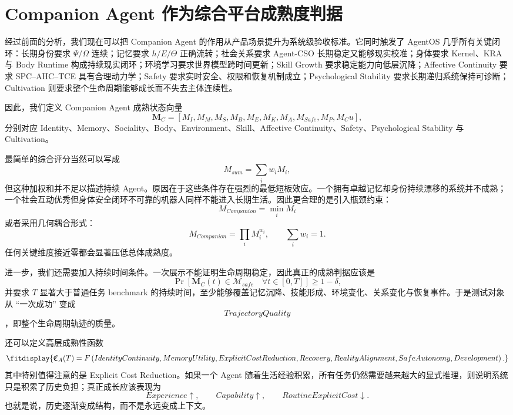\section{Companion Agent 作为综合平台成熟度判据}

经过前面的分析，我们现在可以把 Companion Agent 的作用从产品场景提升为系统级验收标准。它同时触发了 AgentOS 几乎所有关键闭环：长期身份要求 $\Psi/\Omega$ 连续；记忆要求 $h/E/\Theta$ 正确流转；社会关系要求 Agent-CSO 长期稳定又能够现实校准；身体要求 Kernel、KRA 与 Body Runtime 构成持续现实闭环；环境学习要求世界模型跨时间更新；Skill Growth 要求稳定能力向低层沉降；Affective Continuity 要求 SPC--AHC--TCE 具有合理动力学；Safety 要求实时安全、权限和恢复机制成立；Psychological Stability 要求长期递归系统保持可诊断；Cultivation 则要求整个生命周期能够成长而不失去主体连续性。

因此，我们定义 Companion Agent 成熟状态向量
\[
\mathbf M_C
=
[
M_I,
M_M,
M_S,
M_B,
M_E,
M_K,
M_A,
M_{Safe},
M_P,
M_Cu
],
\]
分别对应 Identity、Memory、Sociality、Body、Environment、Skill、Affective Continuity、Safety、Psychological Stability 与 Cultivation。

最简单的综合评分当然可以写成
\[
M_{sum}
=
\sum_i w_i M_i,
\]
但这种加权和并不足以描述持续 Agent。原因在于这些条件存在强烈的最低短板效应。一个拥有卓越记忆却身份持续漂移的系统并不成熟；一个社会互动优秀但身体安全闭环不可靠的机器人同样不能进入长期生活。因此更合理的是引入瓶颈约束：
\[
\boxed{
M_{Companion}
=
\min_i M_i
}
\]
或者采用几何耦合形式：
\[
M_{Companion}
=
\prod_i M_i^{w_i},
\qquad
\sum_i w_i=1.
\]
任何关键维度接近零都会显著压低总体成熟度。

进一步，我们还需要加入持续时间条件。一次展示不能证明生命周期稳定，因此真正的成熟判据应该是
\[
\boxed{
\Pr
\left[
\mathbf M_C(t)\in\mathcal M_{safe}
\quad
\forall t\in[0,T]
\right]
\geq
1-\delta ,
}
\]
并要求 $T$ 显著大于普通任务 benchmark 的持续时间，至少能够覆盖记忆沉降、技能形成、环境变化、关系变化与恢复事件。于是测试对象从 ``一次成功'' 变成
\[
TrajectoryQuality
\]
，即整个生命周期轨迹的质量。

还可以定义高层成熟性函数
\[
\fitdisplay{
\mathfrak C_A(T)
=
F
\left(
IdentityContinuity,
MemoryUtility,
ExplicitCostReduction,
Recovery,
RealityAlignment,
SafeAutonomy,
Development
\right).
}
\]
其中特别值得注意的是 Explicit Cost Reduction。如果一个 Agent 随着生活经验积累，所有任务仍然需要越来越大的显式推理，则说明系统只是积累了历史负担；真正成长应该表现为
\[
Experience\uparrow,
\qquad
Capability\uparrow,
\qquad
RoutineExplicitCost\downarrow.
\]
也就是说，历史逐渐变成结构，而不是永远变成上下文。

